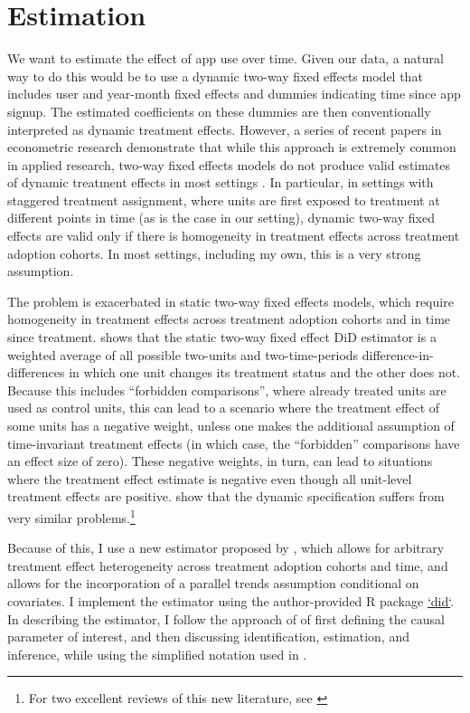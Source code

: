
\section{Estimation}%
\label{sec:estimation}

We want to estimate the effect of app use over time. Given our data, a natural
way to do this would be to use a dynamic two-way fixed effects model that
includes user and year-month fixed effects and dummies indicating time since
app signup. The estimated coefficients on these dummies are then conventionally
interpreted as dynamic treatment effects. However, a series of recent papers in
econometric research demonstrate that while this approach is extremely common
in applied research, two-way fixed effects models do not produce valid
estimates of dynamic treatment effects in most settings
\citep{roth2022trending}. In particular, in settings with staggered treatment
assignment, where units are first exposed to treatment at different points in
time (as is the case in our setting), dynamic two-way fixed effects are valid
only if there is homogeneity in treatment effects across treatment adoption
cohorts. In most settings, including my own, this is a very strong
assumption.

The problem is exacerbated in static two-way fixed effects models, which
require homogeneity in treatment effects across treatment adoption cohorts and
in time since treatment. \citet{goodman2021difference} shows that the static
two-way fixed effect DiD estimator is a weighted average of all possible
two-units and two-time-periods difference-in-differences in which one unit
changes its treatment status and the other does not. Because this includes
``forbidden comparisons'', where already treated units are used as control
units, this can lead to a scenario where the treatment effect of some units has
a negative weight, unless one makes the additional assumption of time-invariant
treatment effects (in which case, the ``forbidden'' comparisons have an effect
size of zero). These negative weights, in turn, can lead to situations where
the treatment effect estimate is negative even though all unit-level treatment
effects are positive. \citet{sun2021estimating} show that the dynamic
specification suffers from very similar problems.\footnote{For two excellent
reviews of this new literature, see \citet{roth2022trending, baker2022much}}

Because of this, I use a new estimator proposed by
\citet{callaway2021difference}, which allows for arbitrary treatment effect
heterogeneity across treatment adoption cohorts and time, and allows for the
incorporation of a parallel trends assumption conditional on covariates. I
implement the estimator using the author-provided R package
\href{https://bcallaway11.github.io/did/}{`did`}. In describing the estimator,
I follow the approach of \citet{callaway2021difference} of first defining the
causal parameter of interest, and then discussing identification, estimation,
and inference, while using the simplified notation used in
\citet{roth2022trending}.

